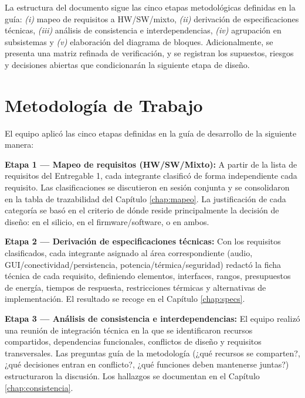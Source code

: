 \documentclass[%
	paper=a4,
	twoside=false,
	parskip=half,
	chapterprefix=false,
	10pt,
	headings=normal,
	bibliography=totoc,
	listof=totoc,
	titlepage=on,
	captions=tableabove,
	draft=false, 
]{scrbook}%
\begin{document}
La estructura del documento sigue las cinco etapas metodológicas definidas en la guía: \textit{(i)} mapeo de requisitos a HW/SW/mixto, \textit{(ii)} derivación de especificaciones técnicas, \textit{(iii)} análisis de consistencia e interdependencias, \textit{(iv)} agrupación en subsistemas y \textit{(v)} elaboración del diagrama de bloques. Adicionalmente, se presenta una matriz refinada de verificación, y se registran los supuestos, riesgos y decisiones abiertas que condicionarán la siguiente etapa de diseño.

\chapter{Metodología de Trabajo}

El equipo aplicó las cinco etapas definidas en la guía de desarrollo de la siguiente manera:

\textbf{Etapa 1 — Mapeo de requisitos (HW/SW/Mixto):} A partir de la lista de requisitos del Entregable 1, cada integrante clasificó de forma independiente cada requisito. Las clasificaciones se discutieron en sesión conjunta y se consolidaron en la tabla de trazabilidad del Capítulo \ref{chap:mapeo}. La justificación de cada categoría se basó en el criterio de dónde reside principalmente la decisión de diseño: en el silicio, en el firmware/software, o en ambos.

\textbf{Etapa 2 — Derivación de especificaciones técnicas:} Con los requisitos clasificados, cada integrante asignado al área correspondiente (audio, GUI/conectividad/persistencia, potencia/térmica/seguridad) redactó la ficha técnica de cada requisito, definiendo elementos, interfaces, rangos, presupuestos de energía, tiempos de respuesta, restricciones térmicas y alternativas de implementación. El resultado se recoge en el Capítulo \ref{chap:specs}.

\textbf{Etapa 3 — Análisis de consistencia e interdependencias:} El equipo realizó una reunión de integración técnica en la que se identificaron recursos compartidos, dependencias funcionales, conflictos de diseño y requisitos transversales. Las preguntas guía de la metodología (¿qué recursos se comparten?, ¿qué decisiones entran en conflicto?, ¿qué funciones deben mantenerse juntas?) estructuraron la discusión. Los hallazgos se documentan en el Capítulo \ref{chap:consistencia}.
\end{document}
